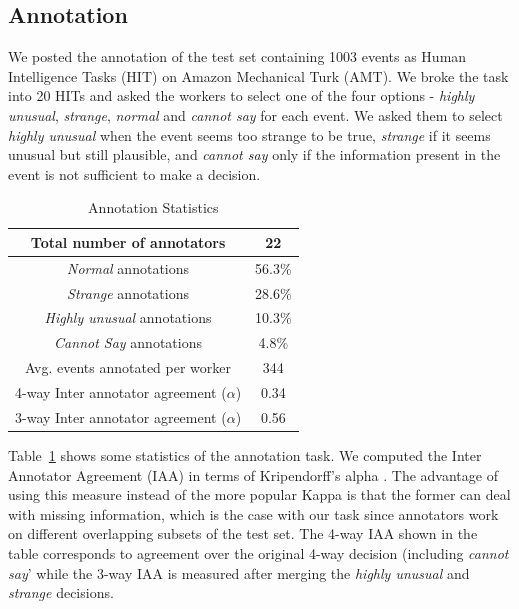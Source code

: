 \subsection{Annotation}
\label{sec:annot}
We posted the annotation of the test set containing 1003 events as
Human Intelligence Tasks (HIT) on Amazon Mechanical Turk (AMT).
We broke the task into 20 HITs and asked the workers to select one of the 
four options - \textit{highly unusual}, \textit{strange}, \textit{normal} and 
\textit{cannot say} for each event.  We asked them to select \textit{highly
unusual} when the 
event seems too strange to be true, \textit{strange} if it seems unusual but 
still plausible, and \textit{cannot say} only if the information present in the 
event is not sufficient to make a decision.

\begin{table}
\begin{center}
  \begin{tabular}[c]{|c|c|}
 \hline
  Total number of annotators & 22\\
  \hline
  \textit{Normal} annotations & 56.3\% \\
  \hline
  \textit{Strange} annotations & 28.6\% \\
  \hline
  \textit{Highly unusual} annotations & 10.3\% \\
  \hline
  \textit{Cannot Say} annotations & 4.8\% \\
  \hline
  Avg. events annotated per worker & 344 \\
  \hline
  4-way Inter annotator agreement ($\alpha$) & 0.34 \\
  \hline
  3-way Inter annotator agreement ($\alpha$) & 0.56 \\
  \hline
  \end{tabular}
\end{center}
 \caption{Annotation Statistics}
 \label{table:annot}
\end{table}
Table~\ref{table:annot} shows some statistics of the annotation task.  We
computed the Inter Annotator
Agreement (IAA) in terms of Kripendorff's alpha \cite{krippendorff1980content}. 
The advantage of using this
measure instead of the more popular Kappa is that the former can deal with
missing information, which is the case with
our task since annotators work on different overlapping subsets of the test set.
 The 4-way IAA shown in the table 
corresponds to agreement over the original 4-way decision (including
\textit{cannot say}' while the 3-way IAA is measured after merging the 
\textit{highly unusual} and \textit{strange} decisions.  

